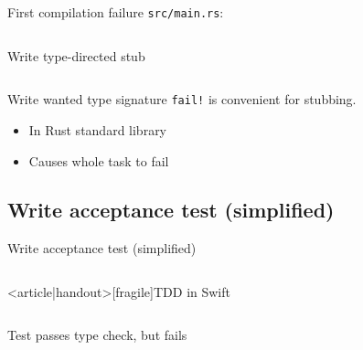 \begin{frame}[fragile]{First compilation failure}
  \texttt{src/main.rs}:
  \inputminted{console}{testQuick.console}
\end{frame}

\begin{frame}[fragile]{Write type-directed stub}
  \inputminted{rust}{Main2.rs}

  \begin{block}{Write wanted type signature}
    \texttt{fail!} is convenient for stubbing.
    \begin{itemize}
    \item In Rust standard library
    \item Causes whole task to fail
    \end{itemize}
  \end{block}
\end{frame}

\subsection{Write acceptance test (simplified)}

\begin{frame}[fragile]{Write acceptance test (simplified)}
  \inputminted[gobble=2]{rust}{MainSpec1.rs}

\end{frame}

\begin{frame}<article|handout>[fragile]{TDD in Swift}
  \inputminted{swift}{MainSpec1.swift}
\end{frame}

\begin{frame}[fragile]{Test passes type check, but fails}
  \inputminted{console}{testQuick2.console}
\end{frame}

